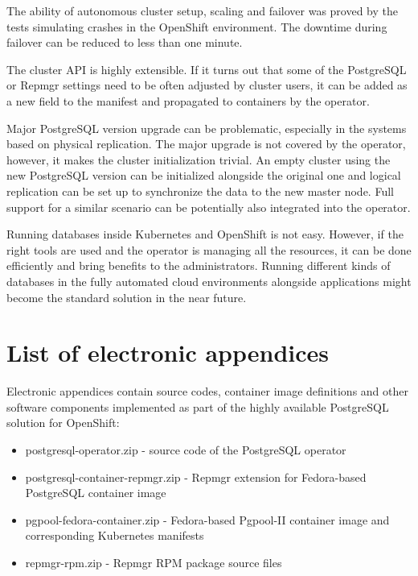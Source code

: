 \documentclass[
  digital, %
  twoside, %
  table,   %
  nolof,   %
  nolot,   %
]{fithesis3}
\begin{document}
The ability of autonomous cluster setup, scaling and failover was proved by the tests simulating crashes in the OpenShift environment. The downtime during failover can be reduced to less than one minute.

The cluster API is highly extensible. If it turns out that some of the PostgreSQL or Repmgr settings need to be often adjusted by cluster users, it can be added as a new field to the manifest and propagated to containers by the operator.

Major PostgreSQL version upgrade can be problematic, especially in the systems based on physical replication. The major upgrade is not covered by the operator, however, it makes the cluster initialization trivial. An empty cluster using the new PostgreSQL version can be initialized alongside the original one and logical replication can be set up to synchronize the data to the new master node. Full support for a similar scenario can be potentially also integrated into the operator.

Running databases inside Kubernetes and OpenShift is not easy. However, if the right tools are used and the operator is managing all the resources, it can be done efficiently and bring benefits to the administrators. Running different kinds of databases in the fully automated cloud environments alongside applications might become the standard solution in the near future.


\appendix %
\chapter{List of electronic appendices} \label{chap:appendices}
Electronic appendices contain source codes, container image definitions and other software components implemented as part of the highly available PostgreSQL solution for OpenShift:
\begin{itemize}
  \item postgresql-operator.zip - source code of the PostgreSQL operator
  \item postgresql-container-repmgr.zip - Repmgr extension for Fedora-based PostgreSQL container image
  \item pgpool-fedora-container.zip - Fedora-based Pgpool-II container image and corresponding Kubernetes manifests
  \item repmgr-rpm.zip - Repmgr RPM package source files
\end{itemize}
\end{document}
